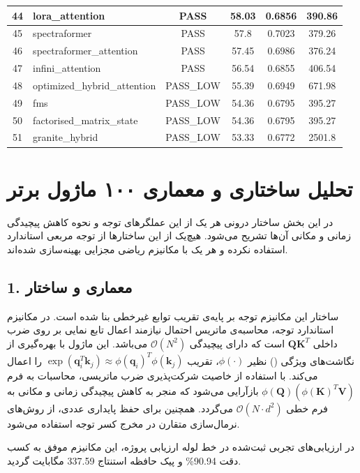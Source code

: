 \documentclass[12pt,a4paper]{report}
\theoremstyle{definition}
\begin{document}
\begin{latin}
\begin{longtable}{@{}|c|l|c|c|c|c|@{}}
\hline
44 & lora\_attention & PASS & 58.03 & 0.6856 & 390.86 \\
\hline
45 & spectraformer & PASS & 57.8 & 0.7023 & 379.26 \\
\hline
46 & spectraformer\_attention & PASS & 57.45 & 0.6986 & 376.24 \\
\hline
47 & infini\_attention & PASS & 56.54 & 0.6855 & 406.54 \\
\hline
48 & optimized\_hybrid\_attention & PASS\_LOW & 55.39 & 0.6949 & 671.98 \\
\hline
49 & fms & PASS\_LOW & 54.36 & 0.6795 & 395.27 \\
\hline
50 & factorised\_matrix\_state & PASS\_LOW & 54.36 & 0.6795 & 395.27 \\
\hline
51 & granite\_hybrid & PASS\_LOW & 53.33 & 0.6772 & 2501.8 \\
\hline

\end{longtable}
\end{latin}

\clearpage
\section{تحلیل ساختاری و معماری ۱۰۰ ماژول برتر}
در این بخش ساختار درونی هر یک از این عملگرهای توجه و نحوه کاهش پیچیدگی زمانی و مکانی آن‌ها تشریح می‌شود. هیچ‌یک از این ساختارها از توجه مربعی استاندارد استفاده نکرده و هر یک با مکانیزم ریاضی مجزایی بهینه‌سازی شده‌اند.

\subsection*{1. معماری و ساختار }
ساختار این مکانیزم توجه بر پایه‌ی تقریب توابع غیرخطی بنا شده است. در مکانیزم استاندارد توجه، محاسبه‌ی ماتریس احتمال نیازمند اعمال تابع نمایی بر روی ضرب داخلی $\mathbf{Q} \mathbf{K}^T$ است که دارای پیچیدگی $\mathcal{O}(N^2)$ می‌باشد. این ماژول با بهره‌گیری از نگاشت‌های ویژگی () نظیر $\phi(\cdot)$، تقریب $\exp(\mathbf{q}_i^T \mathbf{k}_j) \approx \phi(\mathbf{q}_i)^T \phi(\mathbf{k}_j)$ را اعمال می‌کند. با استفاده از خاصیت شرکت‌پذیری ضرب ماتریسی، محاسبات به فرم $\phi(\mathbf{Q}) (\phi(\mathbf{K})^T \mathbf{V})$ بازآرایی می‌شود که منجر به کاهش پیچیدگی زمانی و مکانی به فرم خطی $\mathcal{O}(N \cdot d^2)$ می‌گردد. همچنین برای حفظ پایداری عددی، از روش‌های نرمال‌سازی متقارن در مخرج کسر توجه استفاده می‌شود.

در ارزیابی‌های تجربی ثبت‌شده در خط لوله ارزیابی پروژه، این مکانیزم موفق به کسب دقت 90.94\% و پیک حافظه استنتاج 337.59 مگابایت گردید.
\end{document}
